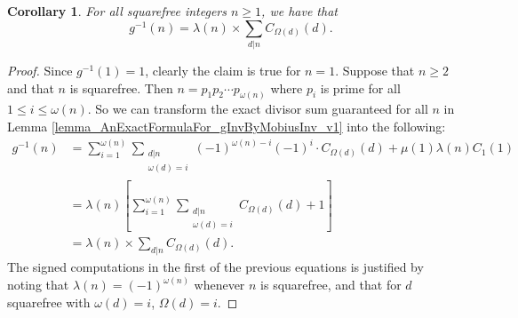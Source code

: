 \documentclass[11pt,reqno,a4letter]{article}
\numberwithin{figure}{section}
\numberwithin{table}{section}
\theoremstyle{plain}
\newtheorem{cor}[theorem]{Corollary}
\numberwithin{theorem}{section}
\theoremstyle{definition}
\begin{document}
\begin{cor} 
\label{cor_AnExactFormulaFor_gInvByMobiusInv_nSqFree_v2} 
For all squarefree integers $n \geq 1$, we have that 
\begin{equation} 
\label{eqn_gInvnSqFreeN_exactDivSum_Formula} 
g^{-1}(n) = \lambda(n) \times \sum_{d|n} C_{\Omega(d)}(d). 
\end{equation} 
\end{cor} 
\begin{proof} 
Since $g^{-1}(1) = 1$, clearly the claim is true for $n = 1$. Suppose that $n \geq 2$ and that 
$n$ is squarefree. Then $n = p_1p_2 \cdots p_{\omega(n)}$ where $p_i$ is prime for all 
$1 \leq i \leq \omega(n)$. So we can transform the exact divisor sum guaranteed for all $n$ in 
Lemma \ref{lemma_AnExactFormulaFor_gInvByMobiusInv_v1} into the following: 
\begin{align*} 
g^{-1}(n) & = \sum_{i=1}^{\omega(n)} \sum_{\substack{d|n \\ \omega(d)=i}} (-1)^{\omega(n) - i} (-1)^{i} \cdot 
     C_{\Omega(d)}(d) + \mu(1) \lambda(n) C_1(1) \\ 
     & = \lambda(n) \left[\sum_{i=1}^{\omega(n)} \sum_{\substack{d|n \\ \omega(d)=i}} C_{\Omega(d)}(d) + 1\right] \\ 
     & = \lambda(n) \times \sum_{d|n} C_{\Omega(d)}(d). 
\end{align*} 
The signed computations in the first of the previous equations is justified by noting that $\lambda(n) = (-1)^{\omega(n)}$ 
whenever $n$ is squarefree, and that for $d$ squarefree with $\omega(d) = i$, $\Omega(d) = i$. 
\end{proof} 
\end{document}
